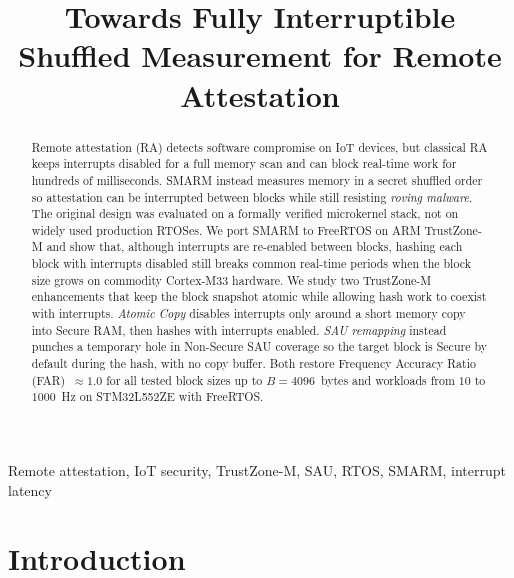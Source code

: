 \documentclass[conference]{IEEEtran}
\begin{document}
\title{Towards Fully Interruptible Shuffled Measurement for Remote Attestation}

\author{
}

\maketitle

\begin{abstract}
Remote attestation (RA) detects software compromise on IoT devices, but
classical RA keeps interrupts disabled for a full memory scan and can
block real-time work for hundreds of milliseconds.
SMARM instead measures memory in a secret shuffled order so attestation
can be interrupted between blocks while still resisting
\emph{roving malware}.
The original design was evaluated on a formally verified microkernel
stack, not on widely used production RTOSes.
We port SMARM to FreeRTOS on ARM TrustZone-M and show that, although
interrupts are re-enabled between blocks, hashing each block with
interrupts disabled still breaks common real-time periods when the block
size grows on commodity Cortex-M33 hardware.
We study two TrustZone-M enhancements that keep the block snapshot
atomic while allowing hash work to coexist with interrupts.
\emph{Atomic Copy} disables interrupts only around a short memory copy
into Secure RAM, then hashes with interrupts enabled.
\emph{SAU remapping} instead punches a temporary hole in Non-Secure SAU
coverage so the target block is Secure by default during the hash, with
no copy buffer. Both restore Frequency Accuracy Ratio
(FAR)~$\approx 1.0$ for all tested block sizes up to $B{=}4096$~bytes
and workloads from $10$ to $1000$~Hz on STM32L552ZE with FreeRTOS.
\end{abstract}

\begin{IEEEkeywords}
Remote attestation, IoT security, TrustZone-M, SAU, RTOS, SMARM,
interrupt latency
\end{IEEEkeywords}

\section{Introduction}
\label{sec:intro}
\end{document}
